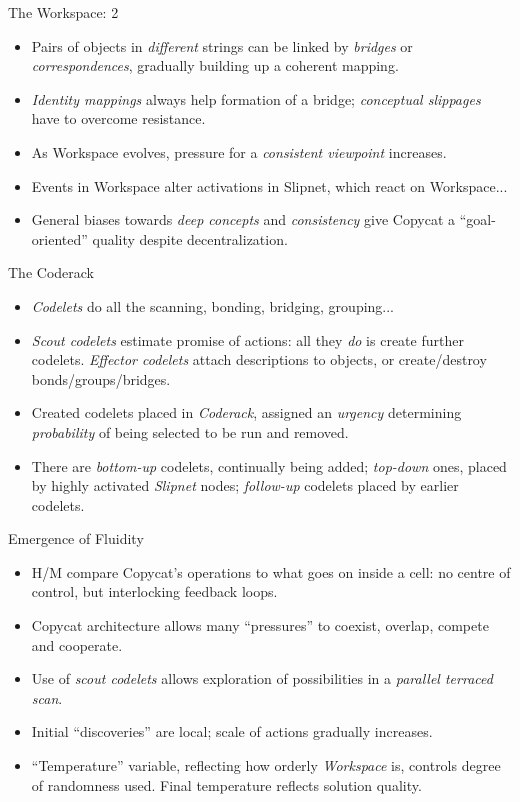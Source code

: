 \documentclass{article}
\begin{document}
\begin{slide}
{\Large The Workspace: 2}
\begin{itemize}
\item Pairs of objects in {\em different} strings can be linked by
{\em bridges} or {\em correspondences}, gradually building up a
coherent mapping.
\item  {\em Identity mappings} always help formation of a bridge;
{\em conceptual slippages} have to overcome resistance.
\item As Workspace evolves, pressure for a {\em consistent viewpoint}
increases.
\item Events in Workspace alter activations in Slipnet, which react on
Workspace...
\item General biases towards {\em deep concepts} and {\em consistency}
give Copycat a ``goal-oriented'' quality despite decentralization.
\end{itemize}
\end{slide}

\begin{slide}
{\Large The Coderack}
\begin{itemize}
\item {\em Codelets} do all the scanning, bonding, bridging, grouping...
\item {\em Scout codelets} estimate promise of
actions: all they {\em do} is create further codelets. {\em
Effector codelets} attach descriptions to objects, or create/destroy
bonds/groups/bridges.
\item Created codelets placed in {\em Coderack}, assigned an
{\em urgency} determining {\em probability} of being selected to be
run and removed.
\item There are {\em bottom-up} codelets, continually being added; {\em
top-down} ones, placed by highly activated {\em Slipnet} nodes; {\em
follow-up} codelets placed by earlier codelets. 
\end{itemize}
\end{slide}

\begin{slide}
{\Large Emergence of Fluidity}
\begin{itemize}
\item H/M compare Copycat's operations to what goes on inside
a cell: no centre of control, but interlocking feedback loops.
\item Copycat architecture allows many ``pressures'' to coexist, overlap,
compete and cooperate.
\item Use of {\em scout codelets} allows exploration of possibilities
in a {\em parallel terraced scan}.
\item Initial ``discoveries'' are local; scale of actions
gradually increases.
\item ``Temperature'' variable, reflecting how orderly
{\em Workspace} is, controls degree of randomness
used. Final temperature reflects solution quality.
\end{itemize}
\end{slide}
\end{document}
